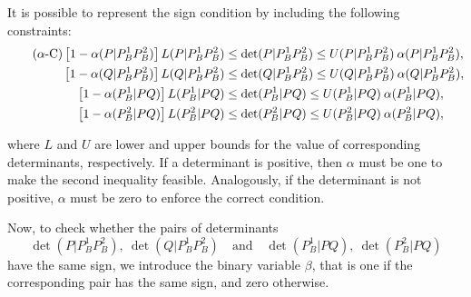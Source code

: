 \documentclass[a4paper,  review, authoryear, 1p.]{elsarticle}
\newcommand{\determinant}[3]{\det({#1|#2#3})}
\begin{document}
		It is possible to represent the sign condition by including the following constraints:
		\begin{align*}\tag{$\alpha$-C}\label{eq:alphaC}
			\left[1-\alphamas{P}{P_B^1}{P_B^2}\right]\LS{P}{P_B^1}{P_B^2}&\leq\determinant{P}{P_B^1}{P_B^2}\leq \US{P}{P_B^1}{P_B^2}\:\alphamas{P}{P_B^1}{P_B^2},\\
			\left[1-\alphamas{Q}{P_B^1}{P_B^2}\right]\LS{Q}{P_B^1}{P_B^2}&\leq\determinant{Q}{P_B^1}{P_B^2}\leq \US{Q}{P_B^1}{P_B^2}\:\alphamas{Q}{P_B^1}{P_B^2},\\
			\left[1-\alphamas{P_B^1}{P}{Q}\right]\LS{P_B^1}{P}{Q}&\leq\determinant{P_B^1}{P}{Q}\leq \US{P_B^1}{P}{Q}\:\alphamas{P_B^1}{P}{Q},\\		\left[1-\alphamas{P_B^2}{P}{Q}\right]\LS{P_B^2}{P}{Q}&\leq\determinant{P_B^2}{P}{Q}\leq \US{P_B^2}{P}{Q}\:\alphamas{P_B^2}{P}{Q},
		\end{align*}
		
		\noindent where $L$ and $U$ are lower and upper bounds for the value of corresponding determinants, respectively. If a determinant is positive, then $\alpha$ must be one to make the second inequality feasible. Analogously, if the determinant is not positive, $\alpha$ must be zero to enforce the correct condition.
		
		\newcommand{\betamas}[4]{\beta(#1#2|#3#4)}
		
		Now, to check whether the pairs of determinants 
		\begin{equation}\label{eq:pair}
			\determinant{P}{P_B^1}{P_B^2},\: \determinant{Q}{P_B^1}{P_B^2}\quad \text{and} \quad \determinant{P_B^1}{P}{Q},\:	 \determinant{P_B^2}{P}{Q}
		\end{equation} 
		have the same sign, we introduce the binary variable $\beta$, that is one if the corresponding pair has the same sign, and zero otherwise.
		
		\newcommand{\gammaprod}[4]{\gamma(#1#2|#3#4)}
		
\end{document}
